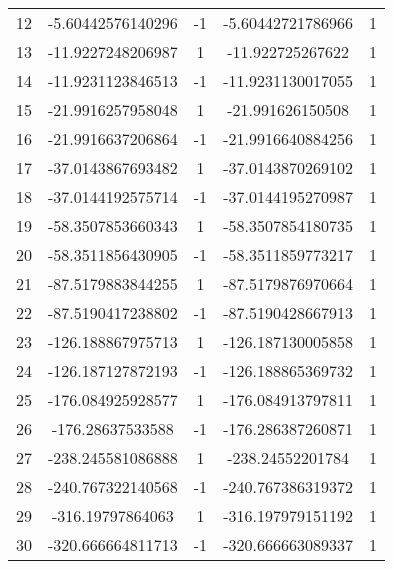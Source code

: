 \begin{table}
\begin{tabular}{c | c   c | c  c |}
		12 & -5.60442576140296    & -1                   & -5.60442721786966     & 1                      \\
		13 & -11.9227248206987    & 1                    & -11.922725267622      & 1                      \\
		14 & -11.9231123846513    & -1                   & -11.9231130017055     & 1                      \\
		15 & -21.9916257958048    & 1                    & -21.991626150508      & 1                      \\
		16 & -21.9916637206864    & -1                   & -21.9916640884256     & 1                      \\
		17 & -37.0143867693482    & 1                    & -37.0143870269102     & 1                      \\
		18 & -37.0144192575714    & -1                   & -37.0144195270987     & 1                      \\
		19 & -58.3507853660343    & 1                    & -58.3507854180735     & 1                      \\
		20 & -58.3511856430905    & -1                   & -58.3511859773217     & 1                      \\
		21 & -87.5179883844255    & 1                    & -87.5179876970664     & 1                      \\
		22 & -87.5190417238802    & -1                   & -87.5190428667913     & 1                      \\
		23 & -126.188867975713    & 1                    & -126.187130005858     & 1                      \\
		24 & -126.187127872193    & -1                   & -126.188865369732     & 1                      \\
		25 & -176.084925928577    & 1                    & -176.084913797811     & 1                      \\
		26 & -176.28637533588     & -1                   & -176.286387260871     & 1                      \\
		27 & -238.245581086888    & 1                    & -238.24552201784      & 1                      \\
		28 & -240.767322140568    & -1                   & -240.767386319372     & 1                      \\
		29 & -316.19797864063     & 1                    & -316.197979151192     & 1                      \\
		30 & -320.666664811713    & -1                   & -320.666663089337     & 1                      \\

\end{tabular}
\end{table}
